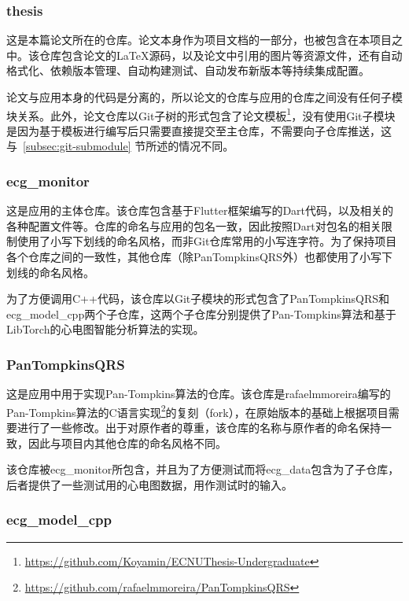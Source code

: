 \subsubsection{thesis}\label{subsubsec:repo-thesis}

这是本篇论文所在的仓库。论文本身作为项目文档的一部分，也被包含在本项目之中。该仓库包含论文的\LaTeX 源码，以及论文中引用的图片等资源文件，还有自动格式化、依赖版本管理、自动构建测试、自动发布新版本等持续集成配置。

论文与应用本身的代码是分离的，所以论文的仓库与应用的仓库之间没有任何子模块关系。此外，论文仓库以Git子树的形式包含了论文模板\footnote{\url{https://github.com/Koyamin/ECNUThesis-Undergraduate}}，没有使用Git子模块是因为基于模板进行编写后只需要直接提交至主仓库，不需要向子仓库推送，这与~\ref{subsec:git-submodule} 节所述的情况不同。

\subsubsection{ecg\_monitor}\label{subsubsec:repo-monitor}

这是应用的主体仓库。该仓库包含基于Flutter框架编写的Dart代码，以及相关的各种配置文件等。仓库的命名与应用的包名一致，因此按照Dart对包名的相关限制使用了小写下划线的命名风格，而非Git仓库常用的小写连字符。为了保持项目各个仓库之间的一致性，其他仓库（除PanTompkinsQRS外）也都使用了小写下划线的命名风格。

为了方便调用C++代码，该仓库以Git子模块的形式包含了PanTompkinsQRS和ecg\_model\_cpp两个子仓库，这两个子仓库分别提供了Pan-Tompkins算法和基于LibTorch的心电图智能分析算法的实现。

\subsubsection{PanTompkinsQRS}\label{subsubsec:repo-qrs}

这是应用中用于实现Pan-Tompkins算法的仓库。该仓库是rafaelmmoreira编写的Pan-Tompkins算法的C语言实现\footnote{\url{https://github.com/rafaelmmoreira/PanTompkinsQRS}}的复刻（fork），在原始版本的基础上根据项目需要进行了一些修改。出于对原作者的尊重，该仓库的名称与原作者的命名保持一致，因此与项目内其他仓库的命名风格不同。

该仓库被ecg\_monitor所包含，并且为了方便测试而将ecg\_data包含为了子仓库，后者提供了一些测试用的心电图数据，用作测试时的输入。

\subsubsection{ecg\_model\_cpp}\label{subsubsec:repo-cpp}

